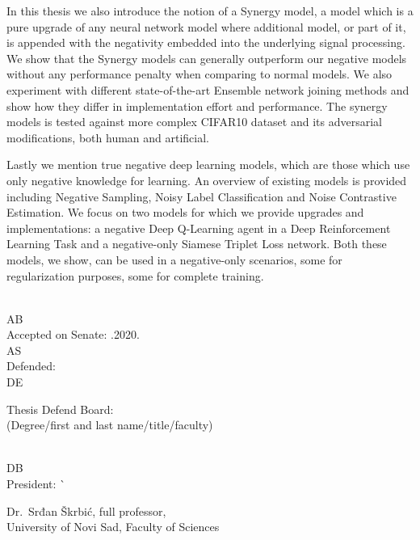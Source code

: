 \begin{tabbing}
\begin{minipage}[t]{.8\textwidth}
In this thesis we also introduce the notion of a Synergy model, a model which is a pure upgrade of any neural network model where additional model, or part of it, is appended with the negativity embedded into the underlying signal processing. We show that the Synergy models can generally outperform our negative models without any performance penalty when comparing to normal models. We also experiment with different state-of-the-art Ensemble network joining methods and show how they differ in implementation effort and performance. The synergy models is tested against more complex CIFAR10 dataset and its adversarial modifications, both human and artificial.

Lastly we mention true negative deep learning models, which are those which use only negative knowledge for learning. An overview of existing models is provided including Negative Sampling, Noisy Label Classification and Noise Contrastive Estimation. We focus on two models for which we provide upgrades and implementations: a negative Deep Q-Learning agent in a Deep Reinforcement Learning Task and a negative-only Siamese Triplet Loss network. Both these models, we show, can be used in a negative-only scenarios, some for regularization purposes, some for complete training.
    \end{minipage}                                          \\
  AB                       \>                               \\
  Accepted on Senate: .2020.      \\
  AS                       \>                               \\
  Defended:                \>                        \\
  DE                       \>                               \\
  \begin{minipage}[t]{.7\textwidth}
    Thesis Defend Board:\\
    \hspace*{\parindent}(Degree/first and last name/title/faculty)
  \end{minipage}\>             \\
  DB                       \>                               \\
  President: \`
    \begin{minipage}[t]{.7\textwidth}
    Dr.~Srđan Škrbić, full professor,\\
    University of Novi Sad, Faculty of Sciences

\end{minipage}
\end{tabbing}
